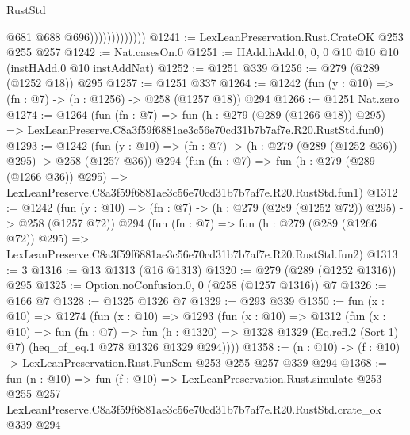 \begin{lexlean}{RustStd}
\begin{coremodule}
                              @681
                              @688
                              @696)))))))))))))
@1241 := LexLeanPreservation.Rust.CrateOK @253 @255 @257
@1242 := Nat.casesOn.{0}
@1251 := HAdd.hAdd.{0, 0, 0} @10 @10 @10 (instHAdd.{0} @10 instAddNat)
@1252 := @1251 @339
@1256 := @279 (@289 (@1252 @18)) @295
@1257 := @1251 @337
@1264 := @1242 (fun (y : @10) => (fn : @7) -> (h : @1256) -> @258 (@1257 @18)) @294
@1266 := @1251 Nat.zero
@1274 := @1264
    (fun (fn : @7) =>
    fun (h : @279 (@289 (@1266 @18)) @295) =>
    LexLeanPreserve.C8a3f59f6881ae3c56e70cd31b7b7af7e.R20.RustStd.fun0)
@1293 := @1242
    (fun (y : @10) => (fn : @7) -> (h : @279 (@289 (@1252 @36)) @295) -> @258 (@1257 @36))
    @294
    (fun (fn : @7) =>
    fun (h : @279 (@289 (@1266 @36)) @295) =>
    LexLeanPreserve.C8a3f59f6881ae3c56e70cd31b7b7af7e.R20.RustStd.fun1)
@1312 := @1242
    (fun (y : @10) => (fn : @7) -> (h : @279 (@289 (@1252 @72)) @295) -> @258 (@1257 @72))
    @294
    (fun (fn : @7) =>
    fun (h : @279 (@289 (@1266 @72)) @295) =>
    LexLeanPreserve.C8a3f59f6881ae3c56e70cd31b7b7af7e.R20.RustStd.fun2)
@1313 := 3
@1316 := @13 @1313 (@16 @1313)
@1320 := @279 (@289 (@1252 @1316)) @295
@1325 := Option.noConfusion.{0, 0} (@258 (@1257 @1316)) @7
@1326 := @166 @7
@1328 := @1325 @1326 @7
@1329 := @293 @339
@1350 := fun (x : @10) =>
  @1274
    (fun (x : @10) =>
    @1293
      (fun (x : @10) =>
      @1312
        (fun (x : @10) =>
        fun (fn : @7) =>
        fun (h : @1320) =>
        @1328 @1329 (Eq.refl.{2} (Sort 1) @7) (heq_of_eq.{1} @278 @1326 @1329 @294))))
@1358 := (n : @10) -> (f : @10) -> LexLeanPreservation.Rust.FunSem @253 @255 @257 @339 @294
@1368 := fun (n : @10) =>
  fun (f : @10) =>
  LexLeanPreservation.Rust.simulate
    @253
    @255
    @257
    LexLeanPreserve.C8a3f59f6881ae3c56e70cd31b7b7af7e.R20.RustStd.crate_ok
    @339
    @294
\end{coremodule}
\end{lexlean}

